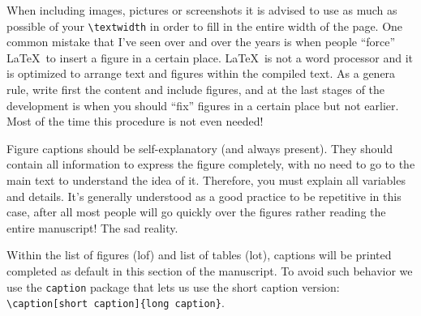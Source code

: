 When including images, pictures or screenshots it is advised to use as much as possible of your \verb|\textwidth| in order to fill in the entire width of the page. One common mistake that I've seen over and over the years is when people ``force'' \LaTeX\ to insert a figure in a certain place. \LaTeX\ is not a word processor and it is optimized to arrange text and figures within the compiled text. As a genera rule, write first the content and include figures, and at the last stages of the development is when you should ``fix'' figures in a certain place but not earlier. Most of the time this procedure is not even needed!



Figure captions should be self-explanatory (and always present). They should contain all information to express the figure completely, with no need to go to the main text to understand the idea of it. Therefore, you must explain all variables and details. It's generally understood as a good practice to be repetitive in this case, after all most people will go quickly over the figures rather reading the entire manuscript! The sad reality.

Within the list of figures (lof) and list of tables (lot), captions will be printed completed as default in this section of the manuscript. To avoid such behavior we use the \texttt{caption} package that lets us use the short caption version: \verb|\caption[short caption]{long caption}|.
